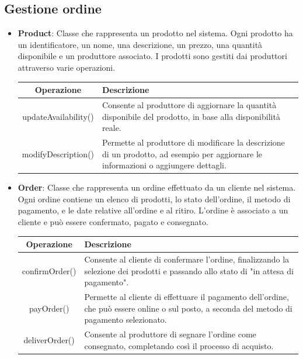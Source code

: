 \subsection{Gestione ordine}
\begin{itemize}
    \item \textbf{Product}:
Classe che rappresenta un prodotto nel sistema. Ogni prodotto ha un identificatore, un nome, una descrizione, un prezzo, una quantità disponibile e un produttore associato. I prodotti sono gestiti dai produttori attraverso varie operazioni.
\begin{table}[!htbp]
    \centering
    \begin{tabularx}{\textwidth}{| c | X |}
    \hline
         \textbf{Operazione} & \textbf{Descrizione} \\
         \hline
         updateAvailability() & Consente al produttore di aggiornare la quantità disponibile del prodotto, in base alla disponibilità reale. \\
         \hline
         modifyDescription() & Permette al produttore di modificare la descrizione di un prodotto, ad esempio per aggiornare le informazioni o aggiungere dettagli. \\
         \hline
    \end{tabularx}
\end{table}

\item \textbf{Order}:
Classe che rappresenta un ordine effettuato da un cliente nel sistema. Ogni ordine contiene un elenco di prodotti, lo stato dell'ordine, il metodo di pagamento, e le date relative all'ordine e al ritiro. L'ordine è associato a un cliente e può essere confermato, pagato e consegnato.
\begin{table}[!htbp]
    \centering
    \begin{tabularx}{\textwidth}{| c | X |}
    \hline
         \textbf{Operazione} & \textbf{Descrizione} \\
         \hline
         confirmOrder() & Consente al cliente di confermare l'ordine, finalizzando la selezione dei prodotti e passando allo stato di "in attesa di pagamento". \\
         \hline
         payOrder() & Permette al cliente di effettuare il pagamento dell'ordine, che può essere online o sul posto, a seconda del metodo di pagamento selezionato. \\
         \hline
         deliverOrder() & Consente al produttore di segnare l'ordine come consegnato, completando così il processo di acquisto. \\
         \hline
    \end{tabularx}
\end{table}


\end{itemize}

